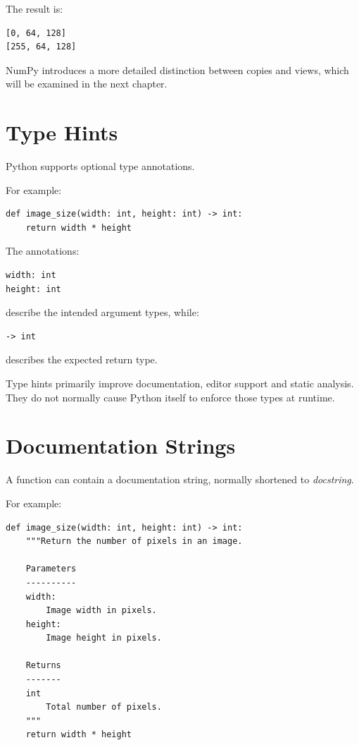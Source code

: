 The result is:

\begin{verbatim}
[0, 64, 128]
[255, 64, 128]
\end{verbatim}

NumPy introduces a more detailed distinction between copies and
views, which will be examined in the next chapter.


\section{Type Hints}
\label{sec:python-type-hints}

Python supports optional type annotations.

For example:

\begin{verbatim}
def image_size(width: int, height: int) -> int:
    return width * height
\end{verbatim}

The annotations:

\begin{verbatim}
width: int
height: int
\end{verbatim}

describe the intended argument types, while:

\begin{verbatim}
-> int
\end{verbatim}

describes the expected return type.

Type hints primarily improve documentation, editor support and static
analysis. They do not normally cause Python itself to enforce those
types at runtime.


\section{Documentation Strings}
\label{sec:python-docstrings}

A function can contain a documentation string, normally shortened to
\emph{docstring}.

For example:

\begin{listing}[htbp]
    \caption{A function containing a documentation string.}
    \label{lst:function-docstring}

\begin{verbatim}
def image_size(width: int, height: int) -> int:
    """Return the number of pixels in an image.

    Parameters
    ----------
    width:
        Image width in pixels.
    height:
        Image height in pixels.

    Returns
    -------
    int
        Total number of pixels.
    """
    return width * height
\end{verbatim}

\end{listing}

